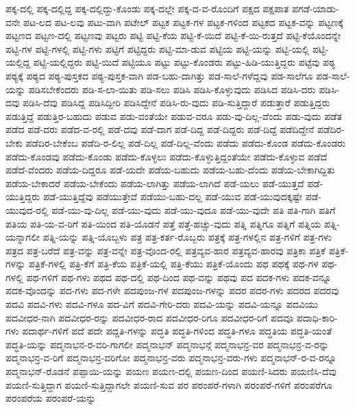 {ಪಕ್ಕ-ದಲ್ಲಿ
ಪಕ್ಕ-ದಲ್ಲಿದ್ದ
ಪಕ್ಕ-ದಲ್ಲಿದ್ದು-ಕೊಂಡು
ಪಕ್ಕ-ದಲ್ಲೇ
ಪಕ್ಕ-ದ-ವ-ರೊಂದಿಗೆ
ಪಕ್ಷದ
ಪಕ್ಷಪಾತ
ಪಗಡೆ-ಯಾಡು-ವನೇ
ಪಟ-ಲದ
ಪಟ-ಲವು
ಪಟು-ವಾಗಿ
ಪಟೇಲ್
ಪಟ್ಟಕ
ಪಟ್ಟಕ-ಗಳ
ಪಟ್ಟಕ-ಗಳಿಂದ
ಪಟ್ಟಕದ
ಪಟ್ಟಕ-ವನ್ನು
ಪಟ್ಟಣಕ್ಕೆ
ಪಟ್ಟಣದ
ಪಟ್ಟಣ-ದಲ್ಲಿ
ಪಟ್ಟಣವು
ಪಟ್ಟರು
ಪಟ್ಟಿ
ಪಟ್ಟಿ-ಕೆಯ
ಪಟ್ಟಿ-ಕೆ-ಯಿದೆ
ಪಟ್ಟಿ-ಕೆ-ಯಿ-ರುತ್ತದೆ
ಪಟ್ಟಿ-ಕೆಯೊಂದನ್ನೇ
ಪಟ್ಟಿ-ಗಳ
ಪಟ್ಟಿ-ಗಳಲ್ಲಿ
ಪಟ್ಟಿ-ಗಳು
ಪಟ್ಟಿಗೆ
ಪಟ್ಟಿದ್ದರು
ಪಟ್ಟಿ-ಮಾ-ಡುವ
ಪಟ್ಟಿಯ
ಪಟ್ಟಿ-ಯನ್ನು
ಪಟ್ಟಿ-ಯಲ್ಲಿ
ಪಟ್ಟಿ-ಯಲ್ಲಿದ್ದ
ಪಟ್ಟಿ-ಯಲ್ಲಿದ್ದರು
ಪಟ್ಟಿ-ಯಿದೆ
ಪಟ್ಟಿಯೂ
ಪಟ್ಟು
ಪಟ್ಟು-ಕೊಂಡರು
ಪಟ್ಟು-ಹಿಡಿ-ಯುತ್ತಿದ್ದರು
ಪಟ್ಟೆವು
ಪಠ್ಯ
ಪಠ್ಯಕ್ಕೆ
ಪಠ್ಯದ
ಪಠ್ಯ-ಪುಸ್ತಕದ
ಪಠ್ಯ-ಪುಸ್ತಕ-ವಾಗಿ
ಪಡ-ಬಹು-ದಾಗಿತ್ತು
ಪಡ-ಸಾಲೆ-ಗಳೆದ್ದವು
ಪಡ-ಸಾಲೆಗೂ
ಪಡ-ಸಾಲೆ-ಯನ್ನು
ಪಡಿಸಬೇಕೆಂದರು
ಪಡಿ-ಸ-ಲಾ-ಯಿತು
ಪಡಿ-ಸಲು
ಪಡಿಸಿ
ಪಡಿಸಿ-ಕೊಳ್ಳುವುದು
ಪಡಿಸಿದ
ಪಡಿಸಿ-ದರು
ಪಡಿಸಿ-ದವು
ಪಡಿಸಿ-ದೆವು
ಪಡಿಸಿದ್ದ
ಪಡಿಸಿದ್ದೀರಿ
ಪಡಿಸಿದ್ದೇನೆ
ಪಡಿಸಿ-ರು-ವುದು
ಪಡಿ-ಸುತ್ತಿದ್ದಾರೆ
ಪಡುತ್ತಾರೆ
ಪಡುತ್ತಿದ್ದರು
ಪಡುತ್ತಿದ್ದೆ
ಪಡುತ್ತಿರ-ಬಹುದು
ಪಡುವ
ಪಡು-ವಂತೆಯೇ
ಪಡುವ-ವರೂ
ಪಡು-ವು-ದಿಲ್ಲ-ವೆಂದು
ಪಡು-ವುದು
ಪಡೆತ
ಪಡೆದ
ಪಡೆ-ದರು
ಪಡೆದ-ವ-ರಲ್ಲಿ
ಪಡೆ-ದವು
ಪಡೆ-ದಾಗ
ಪಡೆ-ದಿದ್ದ
ಪಡೆ-ದಿದ್ದರು
ಪಡೆ-ದಿದ್ದೆ
ಪಡೆದಿದ್ದೇನೆ
ಪಡೆದಿರ-ಬೇಕು
ಪಡೆದಿರ-ಬೇಕೆಂಬ
ಪಡೆದಿ-ರ-ಲಿಲ್ಲ
ಪಡೆ-ದಿಲ್ಲ
ಪಡೆ-ದಿಲ್ಲ-ವೆಂದು
ಪಡೆದು
ಪಡೆದು-ಕೊಂಡ
ಪಡೆದು-ಕೊಂಡರು
ಪಡೆದು-ಕೊಂಡವು
ಪಡೆದು-ಕೊಂಡು
ಪಡೆದು-ಕೊಳ್ಳಲು
ಪಡೆದು-ಕೊಳ್ಳುತ್ತಿದ್ದಂತೆಯೇ
ಪಡೆದು-ಕೊಳ್ಳುವ
ಪಡೆದೆ
ಪಡೆದೆ-ವೆಂದರು
ಪಡೆಯ-ದಿದ್ದರೂ
ಪಡೆ-ಯದೇ
ಪಡೆಯ-ಬಹುದು
ಪಡೆಯ-ಬಹು-ದೆಂದು
ಪಡೆಯ-ಬೇಕಾಗಿದ್ದಿತು
ಪಡೆಯ-ಬೇಕಾದರೆ
ಪಡೆಯ-ಬೇಕೆಂದು
ಪಡೆಯ-ಲಾಗಿತ್ತು
ಪಡೆಯ-ಲಾಗಿದೆ
ಪಡೆ-ಯಲು
ಪಡೆ-ಯುತ್ತದೆ
ಪಡೆ-ಯುತ್ತಿದ್ದರು
ಪಡೆ-ಯುತ್ತಿದ್ದೆವು
ಪಡೆಯುತ್ತೇವೆ
ಪಡೆಯು-ಬಹು-ದಲ್ಲ
ಪಡೆ-ಯುವ
ಪಡೆ-ಯುವುದಕ್ಕಷ್ಟೇ
ಪಡೆ-ಯುವುದ-ರಲ್ಲಿ
ಪಡೆ-ಯು-ವು-ದಿಲ್ಲ
ಪಡೆ-ಯು-ವುದು
ಪಡೆ-ಯು-ವುದೂ
ಪಡೆ-ಯು-ವುದೇ
ಪತಿ
ಪತಿ-ಗಾಗಿ
ಪತಿಗೆ
ಪತಿಯ
ಪತಿ-ಯ-ವ-ರಿಗೆ
ಪತಿ-ಯಿಂದ
ಪತಿ-ಯೊಡನೆ
ಪತ್ತೆ
ಪತ್ತೆ-ಹಚ್ಚು-ವುದು
ಪತ್ನಿ
ಪತ್ನಿಗೂ
ಪತ್ನಿಗೆ
ಪತ್ನಿಯ
ಪತ್ನಿ-ಯನ್ನಾಗಲೀ
ಪತ್ನಿ-ಯನ್ನು
ಪತ್ನಿ-ಯೊಬ್ಬಳು
ಪತ್ರ
ಪತ್ರ-ಕರ್ತ-ರೊಬ್ಬರು
ಪತ್ರಕ್ಕೆ
ಪತ್ರ-ಗಳಲ್ಲಿನ
ಪತ್ರ-ಗಳಿಗೆ
ಪತ್ರ-ಗಳು
ಪತ್ರದ
ಪತ್ರ-ಬರೆದೆ
ಪತ್ರ-ವನ್ನು
ಪತ್ರ-ವನ್ನೇ
ಪತ್ರ-ವೊಂದ-ರಲ್ಲಿ
ಪತ್ರವ್ಯವ-ಹಾರ
ಪತ್ರವ್ಯವ-ಹಾರವು
ಪತ್ರಿಕಾ
ಪತ್ರಿಕೆ
ಪತ್ರಿಕೆ-ಗಳನ್ನು
ಪತ್ರಿಕೆ-ಗಳಲ್ಲಿ
ಪತ್ರಿ-ಕೆಗೆ
ಪತ್ರಿ-ಕೆಯ
ಪತ್ರಿಕೆ-ಯಲ್ಲಿ
ಪತ್ರಿ-ಕೆಯು
ಪತ್ರಿಕೆ-ಯೊಂದು
ಪಥ
ಪಥಕ್ಕೆ
ಪಥ-ಗಳ
ಪಥ-ಗಳಲ್ಲಿ
ಪಥ-ಗಳಿಗೆ
ಪಥ-ಗಳು
ಪಥದ
ಪಥ-ದಲ್ಲಿ
ಪಥ-ದಿಂದ
ಪಥ-ವನ್ನು
ಪಥವು
ಪದ
ಪದಕ-ಗಳು
ಪದಕ-ವನ್ನೂ
ಪದಕ-ವೊಂದನ್ನು
ಪದ-ಗಳು
ಪದ-ಗಳೇ
ಪದಪುಂಜ-ಗಳ
ಪದಪುಂಜ-ಗಳನ್ನು
ಪದರ
ಪದರ-ಗಳು
ಪದರದ
ಪದರವು
ಪದವಿ
ಪದವಿ-ಗಳು
ಪದವಿ-ಗಳೂ
ಪದ-ವಿಗೆ
ಪದವಿ-ಗೇರಿ-ದರು
ಪದವಿ-ಯನ್ನು
ಪದವಿ-ಯನ್ನೂ
ಪದವಿಯು
ಪದವೀಧರ-ನಾಗಿ
ಪದವೀಧರ-ರನ್ನು
ಪದವೀಧರ-ರಾದ
ಪದವೀಧರ-ರಿಗೂ
ಪದವೀಧರ-ರಿಗೆ
ಪದವೂ
ಪದಾಧಿ-ಕಾರಿ-ಗಳು
ಪದಾರ್ಥ-ಗಳಿಗೆ
ಪದೆ
ಪದೇ
ಪದ್ದತಿ-ಗಳನ್ನು
ಪದ್ಧತಿ
ಪದ್ಧತಿ-ಗಳಿಂದ
ಪದ್ಧತಿ-ಗಳೂ
ಪದ್ಧತಿಯ
ಪದ್ಧತಿ-ಯಂತೆ
ಪದ್ಧತಿ-ಯನ್ನು
ಪದ್ಮನಾಭನ-ರ-ವರಿ-ಗಾಗಲೀ
ಪದ್ಮನಾಭನ್
ಪದ್ಮನಾಭನ್ಗೆ
ಪದ್ಮನಾಭನ್ರ-ವರ
ಪದ್ಮನಾಭನ್ರ-ವ-ರನ್ನು
ಪದ್ಮನಾಭನ್ರ-ವ-ರಿಗೆ
ಪದ್ಮನಾಭನ್ರ-ವರಿಗೋ
ಪದ್ಮನಾಭನ್ರ-ವರು
ಪದ್ಮನಾಭನ್ರ-ವರು-ಗಳು
ಪದ್ಮನಾಭನ್-ರ-ವ-ರನ್ನೂ
ಪದ್ಮನಾಭನ್-ರೊಡನೆ
ಪಪ್ಪಾಯಿ-ಯನ್ನು
ಪಯಣ
ಪಯಣ-ದಲ್ಲಿ
ಪಯಣ-ದಿಂದ
ಪಯಣಿ-ಸಿದರು
ಪಯಣಿಸಿ-ದೆವು
ಪಯಣಿ-ಸುತ್ತಿದ್ದಾಗ
ಪಯಣಿ-ಸುತ್ತಿದ್ದಾಗಲೇ
ಪಯಣಿ-ಸುವ
ಪರ
ಪರಂಪರೆ-ಗಳಾಗಿ
ಪರಂಪರೆ-ಗಳಿಗೆ
ಪರಂಪರೆಗೂ
ಪರಂಪರೆಯ
ಪರಂಪರೆ-ಯನ್ನು
}
